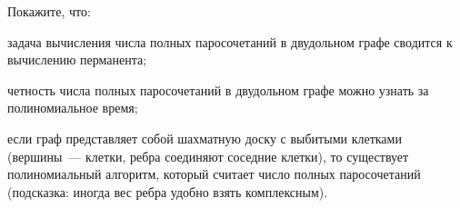 Покажите, что:
\begin{enumcyr}
    \item задача вычисления числа полных паросочетаний в двудольном графе сводится к вычислению
        перманента;
    \item четность числа полных паросочетаний в двудольном графе можно узнать за полиномиальное время;
    \item если граф представляет собой шахматную доску с выбитыми клетками (вершины~--- клетки, ребра
        соединяют соседние клетки), то существует полиномиальный алгоритм, который считает число полных
        паросочетаний (подсказка: иногда вес ребра удобно взять комплексным).
\end{enumcyr}